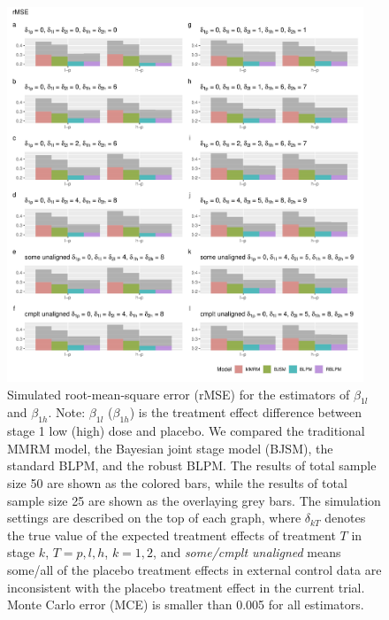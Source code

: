 \begin{figure}
\includegraphics[width=0.95\textwidth]{chapters/figures/rMSE_longitudinal.pdf}
\caption{Simulated root-mean-square error (rMSE) for the estimators of $\beta_{1l}$ and $\beta_{1h}$. \protect \linebreak Note: $\beta_{1l}$ ($\beta_{1h}$) is the treatment effect difference between stage 1 low (high) dose and placebo. We compared the traditional MMRM model, the Bayesian joint stage model (BJSM), the standard BLPM, and the robust BLPM. The results of total sample size 50 are shown as the colored bars, while the results of total sample size 25 are shown as the overlaying grey bars. The simulation settings are described on the top of each graph, where $\delta_{kT}$ denotes the true value of the expected treatment effects of treatment $T$ in stage $k$, $T = p, l, h$, $k = 1, 2$, and \emph{some/cmplt unaligned} means some/all of the placebo treatment effects in external control data are inconsistent with the placebo treatment effect in the current trial. Monte Carlo error (MCE) is smaller than 0.005 for all estimators. }
\label{fig:rMSE_longitudinal}
\end{figure}


